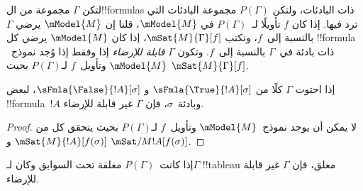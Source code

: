\documentclass[../../../include/open-logic-section]{subfiles}
\begin{document}
\begin{defn}
  لتكن $\Gamma$ مجموعة من ال!!{formula}s ذات البادئات، ولتكن
  $P(\Gamma)$ مجموعة البادئات التي ترد فيها. إذا كان $f$ تأويلًا
  لـ~$P(\Gamma)$ في $\mModel{M}$، قلنا إن $\mModel{M}$ يرضي $\Gamma$
  بالنسبة إلى~$f$، ونكتب $\mSat{M}{\Gamma}[f]$، إذا كان $\mModel{M}$
  يرضي كل !!{formula} ذات بادئة في~$\Gamma$ بالنسبة إلى~$f$. وتكون
  $\Gamma$ \emph{قابلة للإرضاء} إذا وفقط إذا وُجد نموذج~$\mModel{M}$
  وتأويل~$f$ لـ$P(\Gamma)$ بحيث $\mSat{M}{\Gamma}[f]$.
\end{defn}

\begin{prop}
  إذا احتوت $\Gamma$ كلًا من $\sFmla{\True}{!A}[\sigma]$ و
  $\sFmla{\False}{!A}[\sigma]$، لبعض !!{formula}~$!A$ وبادئة~$\sigma$،
  فإن $\Gamma$ غير قابلة للإرضاء.
\end{prop}

\begin{proof}
  لا يمكن أن يوجد نموذج~$\mModel{M}$ وتأويل~$f$ لـ$P(\Gamma)$ بحيث
  يتحقق كل من $\mSat{M}{!A}[f(\sigma)]$ و
  $\mSat/{M}{!A}[f(\sigma)]$.
\end{proof}

\begin{thm}[السلامة]
  إذا كانت~$P(\Gamma)$ مغلقة تحت السوابق وكان لـ$\Gamma$ !!{tableau}
  مغلق، فإن $\Gamma$ غير قابلة للإرضاء.
\end{thm}
\end{document}
